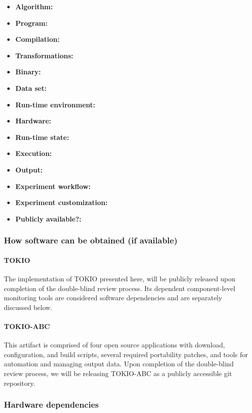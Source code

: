 {\small
\begin{itemize}
  \item {\bf Algorithm: }
  \item {\bf Program: }
  \item {\bf Compilation: }
  \item {\bf Transformations: }
  \item {\bf Binary: } 
  \item {\bf Data set: }
  \item {\bf Run-time environment: }
  \item {\bf Hardware: }
  \item {\bf Run-time state: }
  \item {\bf Execution: }
  \item {\bf Output: }
  \item {\bf Experiment workflow: }
  \item {\bf Experiment customization: }
  \item {\bf Publicly available?: }
\end{itemize}
}


\subsubsection{How software can be obtained (if available)}

\paragraph{TOKIO}
The implementation of TOKIO presented here, will be publicly released upon completion of the double-blind review process.  Its dependent component-level monitoring tools are considered software dependencies and are separately discussed below.

\paragraph{TOKIO-ABC}
This artifact is comprised of four open source applications with download, configuration, and build scripts, several required portability patches, and tools for automation and managing output data.  Upon completion of the double-blind review process, we will be releasing TOKIO-ABC as a publicly accessible git repository.

\subsubsection{Hardware dependencies}

